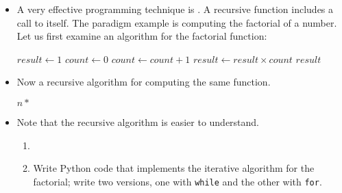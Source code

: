 \documentclass[a4paper]{article}
\begin{document}
{\begin{itemize}
\item A very effective programming technique is . A recursive
function includes a call to itself. The paradigm example is computing the
factorial of a number. Let us first examine an  algorithm for
the factorial function:

\begin{ucodeframe}
\vspace{1em}
\begin{algorithmic}
\State $result \gets 1$
\State $count \gets 0$
		\State $count \gets count + 1$
		\State $result \gets result \times count$
	\EndWhile
\State \Return $result$
\EndFunction
\end{algorithmic}
\end{ucodeframe}

\item Now a recursive algorithm for computing the same function.

\begin{ucodeframe}
\vspace{1em}
\begin{algorithmic}
\State {}
\Else
\State \Return $n*$ 
\EndIf
\EndFunction
\end{algorithmic}

\end{ucodeframe}
\item Note that the recursive algorithm is easier to understand. 

\begin{uexercise}
\begin{enumerate}
\item[]
\item Write Python code that implements the iterative algorithm for
the factorial; write two versions, one with \Verb+while+ and the other with
\Verb+for+.

\begin{hide}
\begin{usolution}
\begin{ucodeframe}
\end{ucodeframe}

\begin{ucodeframe}
\end{ucodeframe}
\end{usolution}
\end{hide}


\end{enumerate}
\end{uexercise}
\end{itemize}}
\end{document}
